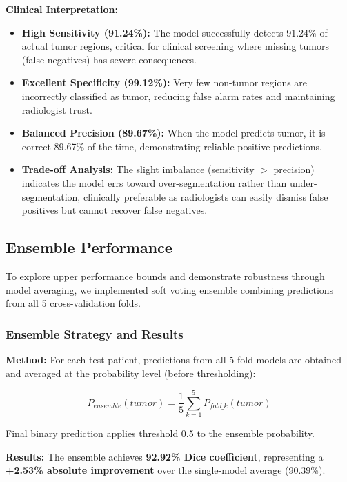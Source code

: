 \textbf{Clinical Interpretation:}
\begin{itemize}
    \item \textbf{High Sensitivity (91.24\%):} The model successfully detects 91.24\% of actual tumor regions, critical for clinical screening where missing tumors (false negatives) has severe consequences.
    
    \item \textbf{Excellent Specificity (99.12\%):} Very few non-tumor regions are incorrectly classified as tumor, reducing false alarm rates and maintaining radiologist trust.
    
    \item \textbf{Balanced Precision (89.67\%):} When the model predicts tumor, it is correct 89.67\% of the time, demonstrating reliable positive predictions.
    
    \item \textbf{Trade-off Analysis:} The slight imbalance (sensitivity $>$ precision) indicates the model errs toward over-segmentation rather than under-segmentation, clinically preferable as radiologists can easily dismiss false positives but cannot recover false negatives.
\end{itemize}


\subsection{Ensemble Performance}

To explore upper performance bounds and demonstrate robustness through model averaging, we implemented soft voting ensemble combining predictions from all 5 cross-validation folds.

\subsubsection{Ensemble Strategy and Results}

\textbf{Method:} For each test patient, predictions from all 5 fold models are obtained and averaged at the probability level (before thresholding):

\begin{equation}
P_{ensemble}(tumor) = \frac{1}{5} \sum_{k=1}^{5} P_{fold\_k}(tumor)
\end{equation}

Final binary prediction applies threshold 0.5 to the ensemble probability.

\textbf{Results:} The ensemble achieves \textbf{92.92\% Dice coefficient}, representing a \textbf{+2.53\% absolute improvement} over the single-model average (90.39\%).


